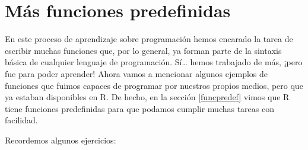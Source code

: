 \documentclass[
]{book}
\begin{document}
\hypertarget{muxe1s-funciones-predefinidas}{%
\section{Más funciones predefinidas}\label{muxe1s-funciones-predefinidas}}

En este proceso de aprendizaje sobre programación hemos encarado la tarea de escribir muchas funciones que, por lo general, ya forman parte de la sintaxis básica de cualquier lenguaje de programación. Sí\ldots{} hemos trabajado de más, ¡pero fue para poder aprender! Ahora vamos a mencionar algunos ejemplos de funciones que fuimos capaces de programar por nuestros propios medios, pero que ya estaban disponibles en R. De hecho, en la sección \ref{funcpredef} vimos que R tiene funciones predefinidas para que podamos cumplir muchas tareas con facilidad.

Recordemos algunos ejercicios:
\end{document}
